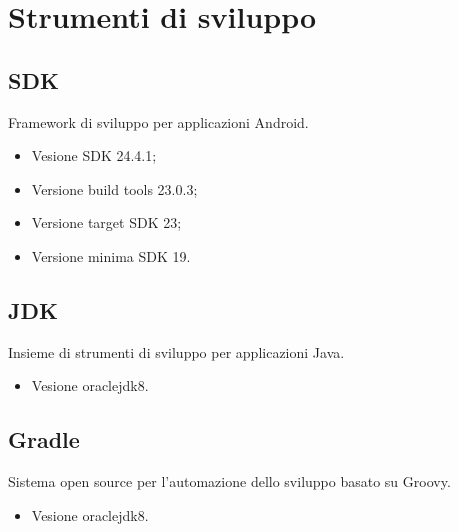 \documentclass[../ManualeSviluppatore.tex]{subfiles}
\begin{document}
\section{Strumenti di sviluppo}
	\subsection{SDK}
		Framework di sviluppo per applicazioni Android.
		\begin{itemize} 
			\item Vesione SDK 24.4.1;
			\item Versione build tools 23.0.3;
			\item Versione target SDK 23;
			\item Versione minima SDK 19.
		\end{itemize}
	\subsection{JDK}
		Insieme di strumenti di sviluppo per applicazioni Java. 
		\begin{itemize} 
			\item Vesione oraclejdk8.
		\end{itemize}
	\subsection{Gradle}
		Sistema open source per l'automazione dello sviluppo basato su Groovy.
		\begin{itemize} 
			\item Vesione oraclejdk8.
		\end{itemize}
\end{document}
